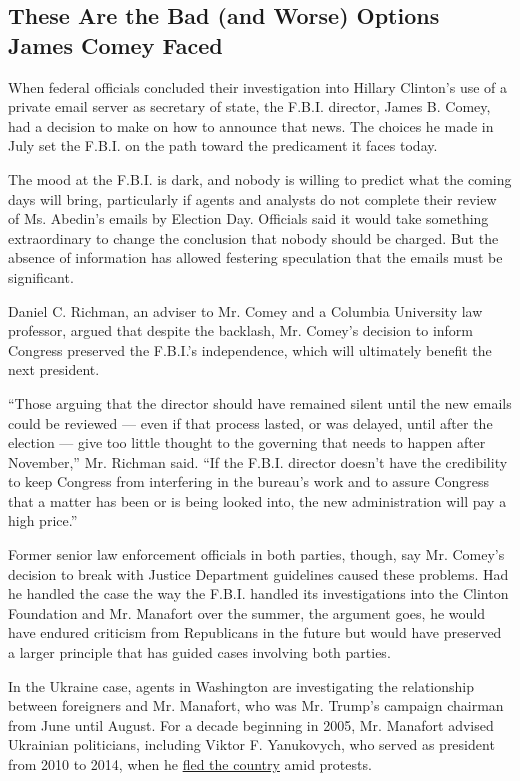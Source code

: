 \hypertarget{these-are-the-bad-and-worse-options-james-comey-faced}{%
\subsection{These Are the Bad (and Worse) Options James Comey
Faced}\label{these-are-the-bad-and-worse-options-james-comey-faced}}

When federal officials concluded their investigation into Hillary
Clinton's use of a private email server as secretary of state, the
F.B.I. director, James B. Comey, had a decision to make on how to
announce that news. The choices he made in July set the F.B.I. on the
path toward the predicament it faces today.

The mood at the F.B.I. is dark, and nobody is willing to predict what
the coming days will bring, particularly if agents and analysts do not
complete their review of Ms. Abedin's emails by Election Day. Officials
said it would take something extraordinary to change the conclusion that
nobody should be charged. But the absence of information has allowed
festering speculation that the emails must be significant.

Daniel C. Richman, an adviser to Mr. Comey and a Columbia University law
professor, argued that despite the backlash, Mr. Comey's decision to
inform Congress preserved the F.B.I.'s independence, which will
ultimately benefit the next president.

``Those arguing that the director should have remained silent until the
new emails could be reviewed --- even if that process lasted, or was
delayed, until after the election --- give too little thought to the
governing that needs to happen after November,'' Mr. Richman said. ``If
the F.B.I. director doesn't have the credibility to keep Congress from
interfering in the bureau's work and to assure Congress that a matter
has been or is being looked into, the new administration will pay a high
price.''

Former senior law enforcement officials in both parties, though, say Mr.
Comey's decision to break with Justice Department guidelines caused
these problems. Had he handled the case the way the F.B.I. handled its
investigations into the Clinton Foundation and Mr. Manafort over the
summer, the argument goes, he would have endured criticism from
Republicans in the future but would have preserved a larger principle
that has guided cases involving both parties.

In the Ukraine case, agents in Washington are investigating the
relationship between foreigners and Mr. Manafort, who was Mr. Trump's
campaign chairman from June until August. For a decade beginning in
2005, Mr. Manafort advised Ukrainian politicians, including Viktor F.
Yanukovych, who served as president from 2010 to 2014, when he
\href{http://www.nytimes.com/2014/02/23/world/europe/with-presidents-departure-ukraine-looks-toward-a-murky-future.html}{fled
the country} amid protests.

